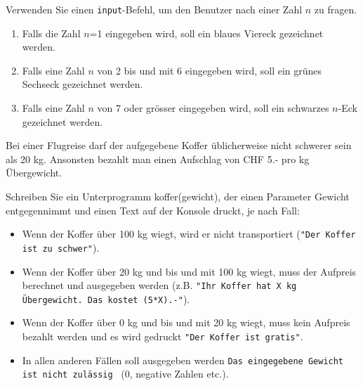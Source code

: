 \begin{myexercise}
	Verwenden Sie einen \lstinline|input|-Befehl, um den Benutzer nach einer Zahl $n$ zu fragen.
	\begin{enumerate}
		\item Falls die Zahl $n$=1 eingegeben wird, soll ein blaues Viereck gezeichnet werden.
		\item Falls eine Zahl $n$ von 2 bis und mit 6 eingegeben wird, soll ein grünes Sechseck gezeichnet werden.
		\item Falls eine Zahl $n$ von 7 oder grösser eingegeben wird, soll ein schwarzes $n$-Eck gezeichnet werden.
	\end{enumerate}
	\begin{myanswer}
		
	\end{myanswer}
\end{myexercise}


\begin{mysubmission}
	Bei einer Flugreise darf der aufgegebene Koffer üblicherweise nicht schwerer sein als 20 kg. Ansonsten bezahlt man einen Aufschlag von CHF 5.- pro kg Übergewicht.

	Schreiben Sie ein Unterprogramm koffer(gewicht), der einen Parameter Gewicht entgegennimmt und einen Text auf der Konsole druckt, je nach Fall:

	\begin{itemize}
		\item Wenn der Koffer über 100 kg wiegt, wird er nicht transportiert (\lstinline|"Der Koffer ist zu schwer"|).
		\item Wenn der Koffer über 20 kg und bis und mit 100 kg wiegt, muss der Aufpreis berechnet und ausgegeben werden (z.B. \lstinline|"Ihr Koffer hat X kg Übergewicht. Das kostet (5*X).-"|).
		\item Wenn der Koffer über 0 kg und bis und mit 20 kg wiegt, muss kein Aufpreis bezahlt werden und es wird gedruckt \lstinline|"Der Koffer ist gratis"|.
		\item  In allen anderen Fällen soll ausgegeben werden \lstinline|Das eingegebene Gewicht ist nicht zulässig|  (0, negative Zahlen etc.).
	\end{itemize}
	\begin{myanswer}
		
	\end{myanswer}
\end{mysubmission}

